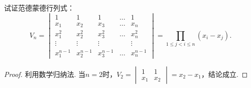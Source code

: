 \begin{example}
试证范德蒙德行列式：
\begin{equation}\label{equation:行列式.范德蒙德行列式}
	V_n = \begin{vmatrix}
		1 & 1 & 1 & \dots & 1 \\
		x_1 & x_2 & x_3 & \dots & x_n \\
		x_1^2 & x_2^2 & x_3^2 & \dots & x_n^2 \\
		\vdots & \vdots & \vdots& & \vdots \\
		x_1^{n-1} & x_2^{n-1} & x_3^{n-1} & \dots & x_n^{n-1}
	\end{vmatrix}
	= \prod_{1 \leq j < i \leq n}(x_i-x_j).
\end{equation}
\begin{proof}
利用数学归纳法.
当\(n=2\)时，\(V_2 = \begin{vmatrix}
	1 & 1 \\ x_1 & x_2
\end{vmatrix} = x_2 - x_1\)，结论成立.


\end{proof}
\end{example}
